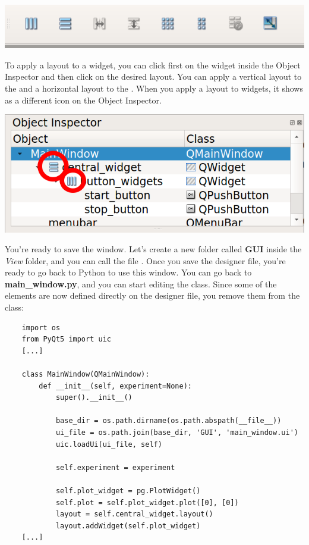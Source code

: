 \begin{center}
    \includegraphics[width=.4\textwidth]{images/Chapter_09/06_layouts.png}
\end{center}

To apply a layout to a widget, you can click first on the widget inside the Object Inspector and then click on the desired layout. You can apply a vertical layout to the  and a horizontal layout to the . When you apply a layout to widgets, it shows as a different icon on the Object Inspector.

\begin{center}
    \includegraphics[width=.4\textwidth]{images/Chapter_09/07_widgets_with_layouts.png}
\end{center}

You're ready to save the window. Let's create a new folder called \textbf{GUI} inside the \emph{View} folder, and you can call the file . Once you save the designer file, you're ready to go back to Python to use this window. You can go back to \textbf{main\_window.py}, and you can start editing the  class. Since some of the elements are now defined directly on the designer file, you remove them from the class:

\begin{verbatim}
    import os
    from PyQt5 import uic
    [...]

    class MainWindow(QMainWindow):
        def __init__(self, experiment=None):
            super().__init__()

            base_dir = os.path.dirname(os.path.abspath(__file__))
            ui_file = os.path.join(base_dir, 'GUI', 'main_window.ui')
            uic.loadUi(ui_file, self)

            self.experiment = experiment

            self.plot_widget = pg.PlotWidget()
            self.plot = self.plot_widget.plot([0], [0])
            layout = self.central_widget.layout()
            layout.addWidget(self.plot_widget)
    [...]
\end{verbatim}

